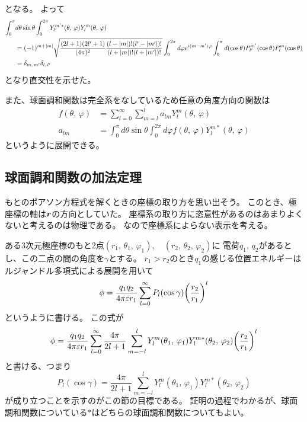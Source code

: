 \documentclass[../../master.tex]{subfiles}
\begin{document}
となる。
よって
\begin{equation}\begin{aligned}[b]
    \int_{0}^{\pi} &d\theta \sin\theta \int_{0}^{2\pi} Y_{l'}^{m'*}(\theta,\,\varphi) Y_l^m(\theta,\,\varphi)\\
	&= (-1)^{m+\abs{m}}\sqrt{\frac{(2l+1)(2l'+1)}{(4\pi)^2}\frac{(l-\abs{m})!(l'-\abs{m'})!}{(l+\abs{m})!(l+\abs{m'})!}}
	\int_{0}^{2\pi}d\varphi e^{i(m-m')\varphi} \int_{0}^{\pi} d(\cos\theta) P_{l'}^{m'}(\cos\theta)P_l^m(\cos\theta)\\
	&=\delta_{m,\,m'}\delta_{l,\,l'}
\end{aligned}\end{equation}
となり直交性を示せた。

また、球面調和関数は完全系をなしているため任意の角度方向の関数は
\begin{align}
	f(\theta,\,\varphi) &= \sum_{l=0}^{\infty}\sum_{m=l}^{l} a_{lm}Y_l^m(\theta,\,\varphi)\\
	a_{lm} &=\int_{0}^{\pi} d\theta\sin\theta\int_{0}^{2\pi}d\varphi f(\theta,\,\varphi)Y_l^{m*}(\theta,\,\varphi)
\end{align}
というように展開できる。

\subsection{球面調和関数の加法定理}
もとのポアソン方程式を解くときの座標の取り方を思い出そう。
このとき、極座標の軸は\(\vb*{r}\)の方向としていた。
座標系の取り方に恣意性があるのはあまりよくないと考えるのは物理である。
なので座標系によらない表示を考える。

ある3次元極座標のもと2点\((r_1,\,\theta_1,\,\varphi_1),\quad (r_2,\,\theta_2,\,\varphi_2)\)に
電荷\(q_1,\,q_2\)があるとし、この二点の間の角度を\(\gamma\)とする。
\(r_1>r_2\)のとき\(q_1\)の感じる位置エネルギーはルジャンドル多項式による展開を用いて
\begin{equation}
	\phi = \frac{q_1 q_2}{4\pi\varepsilon r_1} \sum_{l=0}^{\infty}P_l(\cos\gamma)\qty(\frac{r_2}{r_1})^l
\end{equation}
というように書ける。
この式が
\begin{equation}
	\phi = \frac{q_1 q_2}{4\pi\varepsilon r_1}
	\sum_{l=0}^{\infty}\frac{4\pi}{2l+1}\sum_{m=-l}^{l} Y_l^m(\theta_1,\,\varphi_1) Y_l^{m*}(\theta_2,\,\varphi_2)\qty(\frac{r_2}{r_1})^l
\end{equation}
と書ける、つまり
\begin{equation}
	P_l(\cos\gamma) = \frac{4\pi}{2l+1}\sum_{m=-l}^{l} Y_l^m(\theta_1,\,\varphi_1) Y_l^{m*}(\theta_2,\,\varphi_2)
\end{equation}
が成り立つことを示すのがこの節の目標である。
証明の過程でわかるが、球面調和関数についている\(*\)はどちらの球面調和関数についてもよい。
\end{document}
